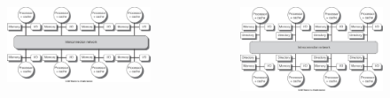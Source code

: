 \documentclass{beamer}
\begin{document}
\begin{frame}
\begin{columns}[c]
\begin{figure}
\includegraphics[width=\linewidth,right]{distributed_mem.jpg}
\end{figure}

\begin{figure}
\includegraphics[width=\linewidth,right]{hybrid_mem.jpg}
\end{figure}

\end{columns}

\end{frame}
\end{document}

